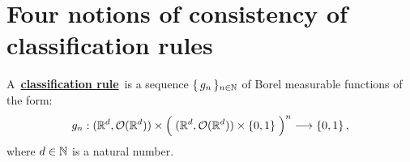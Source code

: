 

\section{Four notions of consistency of classification rules}
\setcounter{theorem}{0}
\setcounter{equation}{0}


\renewcommand{\theenumi}{\roman{enumi}}
\renewcommand{\labelenumi}{\textnormal{(\theenumi)}$\;\;$}


\begin{definition}
\mbox{}\vskip 0.1cm
\noindent
A \,\underline{\textbf{classification rule}}\, is a sequence $\{\,g_{n}\,\}_{n\in\mathbb{N}}$
of Borel measurable functions of the form:
\begin{equation*}
g_{n} :
	(\Re^{d},\mathcal{O}(\Re^{d})) \times \left(\;(\Re^{d},\mathcal{O}(\Re^{d})) \overset{{\color{white}.}}{\times} \{0,1\} \;\right)^{n}
	\longrightarrow
	\{0,1\}\,,
\end{equation*}
where $d \in \mathbb{N}$ is a natural number.
\end{definition}


